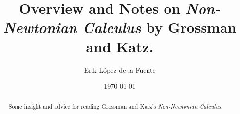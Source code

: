 \documentclass[a4paper, titlepage]{article}
\title{Overview and Notes on \textit{Non-Newtonian Calculus} by Grossman and Katz.}
\author{Erik López de la Fuente}
\date{\today}
\begin{document}
\maketitle

\begin{abstract}
	Some insight and advice for reading Grossman and Katz's \textit{Non-Newtonian Calculus}.
\end{abstract}

\tableofcontents
\newpage




\end{document}
